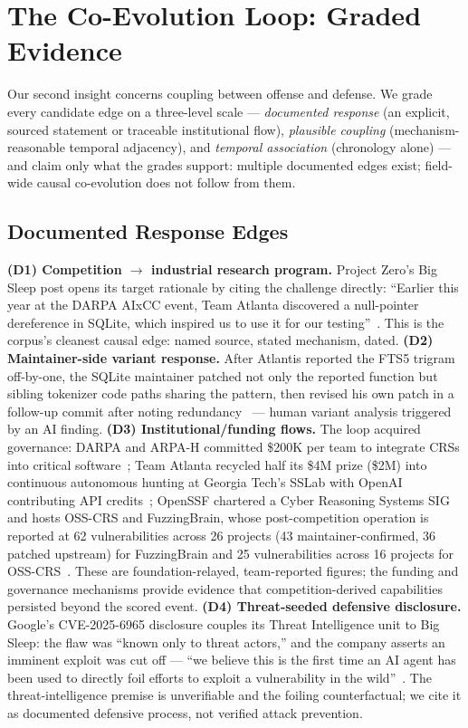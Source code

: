 \section{The Co-Evolution Loop: Graded Evidence}
\label{sec:coevolution}

Our second insight concerns coupling between offense and defense. We grade every candidate edge
on a three-level scale --- \emph{documented response} (an explicit, sourced statement or
traceable institutional flow), \emph{plausible coupling} (mechanism-reasonable temporal
adjacency), and \emph{temporal association} (chronology alone) --- and claim only what the
grades support: multiple documented edges exist; field-wide causal co-evolution does not follow
from them.

\subsection{Documented Response Edges}
\textbf{(D1) Competition $\rightarrow$ industrial research program.} Project Zero's Big Sleep
post opens its target rationale by citing the challenge directly: ``Earlier this year at the
DARPA AIxCC event, Team Atlanta discovered a null-pointer dereference in SQLite, which inspired
us to use it for our testing''~\cite{bigsleep2024naptime}. This is the corpus's cleanest causal
edge: named source, stated mechanism, dated.
\textbf{(D2) Maintainer-side variant response.} After Atlantis reported the FTS5 trigram
off-by-one, the SQLite maintainer patched not only the reported function but sibling tokenizer
code paths sharing the pattern, then revised his own patch in a follow-up commit after noting
redundancy~\cite{taasc2024} --- human variant analysis triggered by an AI finding.
\textbf{(D3) Institutional/funding flows.} The loop acquired governance: DARPA and ARPA-H
committed \$200K per team to integrate CRSs into critical software~\cite{tobbuttercup2025};
Team Atlanta recycled half its \$4M prize (\$2M) into continuous autonomous hunting at Georgia
Tech's SSLab with OpenAI contributing API credits~\cite{taafc2025}; OpenSSF chartered a Cyber
Reasoning Systems SIG and hosts OSS-CRS and FuzzingBrain, whose post-competition operation is
reported at 62 vulnerabilities across 26 projects (43 maintainer-confirmed, 36 patched upstream)
for FuzzingBrain and 25 vulnerabilities across 16 projects for OSS-CRS~\cite{openssfaixcc2026}.
These are foundation-relayed, team-reported figures; the funding and governance mechanisms provide evidence that competition-derived capabilities persisted beyond the scored event.
\textbf{(D4) Threat-seeded defensive disclosure.} Google's CVE-2025-6965 disclosure couples its
Threat Intelligence unit to Big Sleep: the flaw was ``known only to threat actors,'' and the
company asserts an imminent exploit was cut off --- ``we believe this is the first time an AI
agent has been used to directly foil efforts to exploit a vulnerability in the
wild''~\cite{bloggoogle2025,nvd6965}. The threat-intelligence premise is unverifiable and the
foiling counterfactual; we cite it as documented defensive process, not verified attack
prevention.

